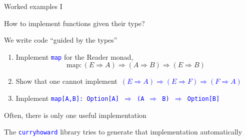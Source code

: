 \documentclass[english]{beamer}
\begin{document}
\begin{frame}{Worked examples I}

How to implement functions given their type?

We write code ``guided by the types''
\begin{enumerate}
\item Implement \texttt{\textcolor{blue}{\footnotesize{}map}} for the Reader
monad,{\footnotesize{}
\[
\text{map}:\left(E\Rightarrow A\right)\Rightarrow\left(A\Rightarrow B\right)\Rightarrow\left(E\Rightarrow B\right)
\]
}{\footnotesize \par}
\item Show that one cannot implement\texttt{\textcolor{blue}{\footnotesize{}
$\left(E\Rightarrow A\right)\Rightarrow\left(E\Rightarrow F\right)\Rightarrow\left(F\Rightarrow A\right)$}}{\footnotesize \par}
\item Implement \texttt{\textcolor{blue}{\footnotesize{}map{[}A,B{]}:\ Option{[}A{]}
$\Rightarrow$ (A $\Rightarrow$ B) $\Rightarrow$ Option{[}B{]}}}{\footnotesize \par}
\end{enumerate}
Often, there is only one useful implementation

The \texttt{\textcolor{blue}{\footnotesize{}curryhoward}} library
tries to generate that implementation automatically
\end{frame}
\end{document}

